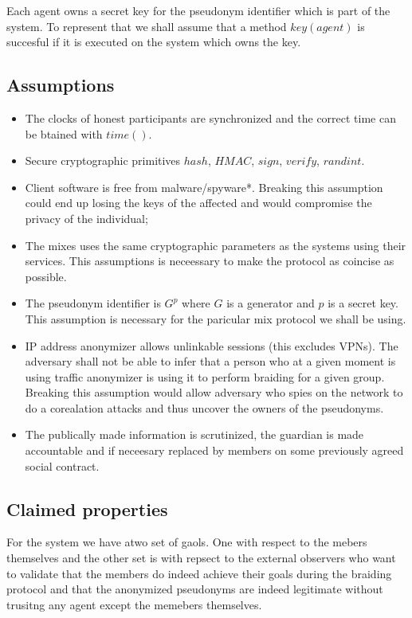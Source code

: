 \documentclass[12pt]{article}
\begin{document}
Each agent owns a secret key for the pseudonym identifier which is part of the system. To represent that we shall assume that a method $key(agent)$ is succesful if it is executed on the system which owns the key. 


\subsection*{Assumptions}

\begin{itemize}
\item The clocks of honest participants are synchronized and the correct time can be btained with $time()$.
\item Secure cryptographic primitives $hash$, $HMAC$, $sign$, $verify$, $randint$.
\item Client software is free from malware/spyware*. Breaking this assumption could end up losing the keys of the affected and would compromise the privacy of the individual;
\item The mixes uses the same cryptographic parameters as the systems using their services. This assumptions is neceessary to make the protocol as coincise as possible.
\item The pseudonym identifier is $G^p$ where $G$ is a generator and $p$ is a secret key. This assumption is necessary for the paricular mix protocol we shall be using.
\item IP address anonymizer allows unlinkable sessions (this excludes VPNs). The adversary shall not be able to infer that a person who at a given moment is using traffic anonymizer is using it to perform braiding for a given group. Breaking this assumption would allow adversary who spies on the network to do a corealation attacks and thus uncover the owners of the pseudonyms. 
\item The publically made information is scrutinized, the guardian is made accountable and if neceesary replaced by members on some previously agreed social contract. 
\end{itemize}


\subsection*{Claimed properties}

For the system we have atwo set of gaols. One with respect to the mebers themselves and the other set is with repsect to the external observers who want to validate that the members do indeed achieve their goals during the braiding protocol and that the anonymized pseudonyms are indeed legitimate without trusitng any agent except the memebers themselves. 
\end{document}
